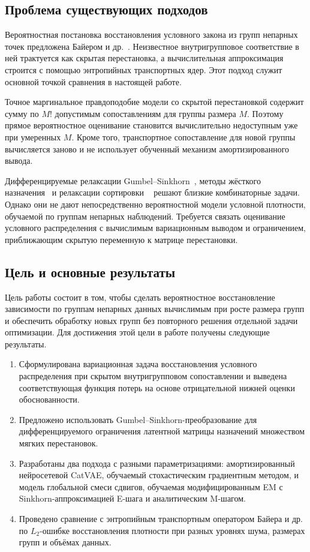 \subsection{Проблема существующих подходов}

Вероятностная постановка восстановления условного закона из групп непарных точек предложена
Байером и др.~\cite{beier2024transfer}. Неизвестное внутригрупповое соответствие в ней
трактуется как скрытая перестановка, а вычислительная аппроксимация строится с помощью
энтропийных транспортных ядер. Этот подход служит основной точкой сравнения в настоящей
работе.

Точное маргинальное правдоподобие модели со скрытой перестановкой содержит сумму по $M!$
допустимым сопоставлениям для группы размера $M$. Поэтому прямое вероятностное оценивание
становится вычислительно недоступным уже при умеренных $M$. Кроме того, транспортное
сопоставление для новой группы вычисляется заново и не использует обученный механизм
амортизированного вывода.

Дифференцируемые релаксации Gumbel--Sinkhorn~\cite{mena2018sinkhorn}, методы жёсткого
назначения~\cite{rezatofighi2018perm,carion2020detr} и релаксации сортировки
~\cite{prillo2020softsort,grover2019neuralsort} решают близкие комбинаторные задачи. Однако
они не дают непосредственно вероятностной модели условной плотности, обучаемой по группам
непарных наблюдений. Требуется связать оценивание условного распределения с вычислимым
вариационным выводом и ограничением, приближающим скрытую переменную к матрице перестановки.

\subsection{Цель и основные результаты}

Цель работы состоит в том, чтобы сделать вероятностное восстановление зависимости по
группам непарных данных вычислимым при росте размера групп и обеспечить обработку новых
групп без повторного решения отдельной задачи оптимизации. Для достижения этой цели в
работе получены следующие результаты.
\begin{enumerate}
  \item Сформулирована вариационная задача восстановления условного распределения при
  скрытом внутригрупповом сопоставлении и выведена соответствующая функция потерь на основе
  отрицательной нижней оценки обоснованности.
  \item Предложено использовать Gumbel--Sinkhorn-преобразование для дифференцируемого
  ограничения латентной матрицы назначений множеством мягких перестановок.
  \item Разработаны два подхода с разными параметризациями: амортизированный нейросетевой
  CatVAE, обучаемый стохастическим градиентным методом, и модель глобальной смеси сдвигов,
  обучаемая модифицированным EM с Sinkhorn-аппроксимацией E-шага и аналитическим M-шагом.
  \item Проведено сравнение с энтропийным транспортным оператором
  Байера и др.~\cite{beier2024transfer} по $L_2$-ошибке восстановления плотности при разных
  уровнях шума, размерах групп и объёмах данных.
\end{enumerate}
